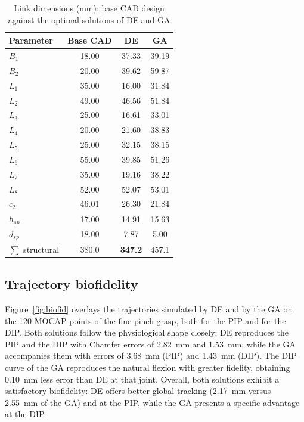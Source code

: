 \documentclass[conference]{IEEEtran}
\begin{document}
\begin{table}[htbp]
\caption{Link dimensions (mm): base CAD design against the optimal solutions of
DE and GA}
\begin{center}
\begin{tabular}{|l|c|c|c|}
\hline
\textbf{Parameter} & \textbf{Base CAD} & \textbf{DE} & \textbf{GA} \\
\hline
$B_1$  & 18.00 & 37.33 & 39.19 \\
\hline
$B_2$  & 20.00 & 39.62 & 59.87 \\
\hline
$L_1$  & 35.00 & 16.00 & 31.84 \\
\hline
$L_2$  & 49.00 & 46.56 & 51.84 \\
\hline
$L_3$  & 25.00 & 16.61 & 33.01 \\
\hline
$L_4$  & 20.00 & 21.60 & 38.83 \\
\hline
$L_5$  & 25.00 & 32.15 & 38.15 \\
\hline
$L_6$  & 55.00 & 39.85 & 51.26 \\
\hline
$L_7$  & 35.00 & 19.16 & 38.22 \\
\hline
$L_8$  & 52.00 & 52.07 & 53.01 \\
\hline
$c_2$  & 46.01 & 26.30 & 21.84 \\
\hline
$h_{sp}$ & 17.00 & 14.91 & 15.63 \\
\hline
$d_{sp}$ & 18.00 & \phantom{0}7.87 & \phantom{0}5.00 \\
\hline
$\sum$ structural & 380.0 & \textbf{347.2} & 457.1 \\
\hline
\end{tabular}
\label{tab:dimensiones}
\end{center}
\end{table}

\subsection{Trajectory biofidelity}
Figure~\ref{fig:biofid} overlays the trajectories simulated by DE and by the GA
on the 120 MOCAP points of the fine pinch grasp, both for the PIP and for the
DIP. Both solutions follow the physiological shape closely: DE reproduces the PIP
and the DIP with Chamfer errors of 2.82~mm and 1.53~mm, while the GA accompanies
them with errors of 3.68~mm (PIP) and 1.43~mm (DIP). The DIP curve of the GA
reproduces the natural flexion with greater fidelity, obtaining 0.10~mm less
error than DE at that joint. Overall, both solutions exhibit a satisfactory
biofidelity: DE offers better global tracking (2.17~mm versus 2.55~mm of the GA)
and at the PIP, while the GA presents a specific advantage at the DIP.
\end{document}
